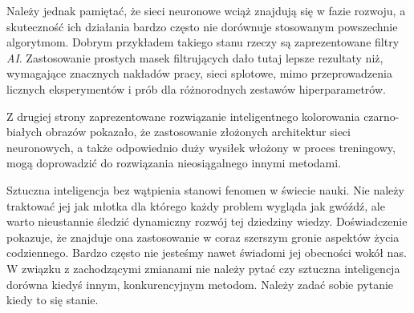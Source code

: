 \documentclass[10pt, a4paper, twoside]{article}
\begin{document}
  Należy jednak pamiętać, że sieci neuronowe wciąż znajdują się w fazie rozwoju,
  a skuteczność ich działania bardzo często nie dorównuje stosowanym powszechnie
  algorytmom. Dobrym przykładem takiego stanu rzeczy są zaprezentowane filtry \textit{AI}.
  Zastosowanie prostych masek filtrujących dało tutaj lepsze rezultaty niż,
  wymagające znacznych nakładów pracy, sieci splotowe, mimo przeprowadzenia licznych
  eksperymentów i prób dla różnorodnych zestawów hiperparametrów.

  Z drugiej strony zaprezentowane rozwiązanie inteligentnego kolorowania
  czarno-białych obrazów pokazało, że zastosowanie złożonych architektur sieci
  neuronowych, a także odpowiednio duży wysiłek włożony w proces treningowy,
  mogą doprowadzić do rozwiązania nieosiągalnego innymi metodami.

  Sztuczna inteligencja bez wątpienia stanowi fenomen w świecie nauki. Nie należy
  traktować jej jak młotka dla którego każdy problem wygląda jak gwóźdź, ale warto
  nieustannie śledzić dynamiczny rozwój tej dziedziny wiedzy. Doświadczenie pokazuje,
  że znajduje ona zastosowanie w coraz szerszym gronie aspektów życia codziennego.
  Bardzo często nie jesteśmy nawet świadomi jej obecności wokół nas. W związku z
  zachodzącymi zmianami nie należy pytać czy sztuczna inteligencja dorówna kiedyś
  innym, konkurencyjnym metodom. Należy zadać sobie pytanie kiedy to się stanie.




\end{document}
